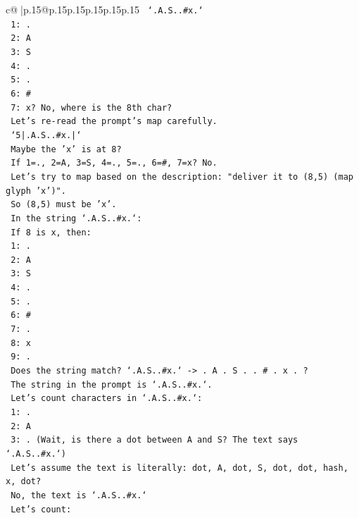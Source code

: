 \documentclass{article}
\begin{document}
{\begin{supertabular}{c@{$\;$}|p{.15\linewidth}@{}p{.15\linewidth}p{.15\linewidth}p{.15\linewidth}p{.15\linewidth}p{.15\linewidth}}
{{{\texttt{   `.A.S..\#x.`} \\
\texttt{   1: .} \\
\texttt{   2: A} \\
\texttt{   3: S} \\
\texttt{   4: .} \\
\texttt{   5: .} \\
\texttt{   6: \#} \\
\texttt{   7: x? No, where is the 8th char?} \\
\texttt{   Let's re{-}read the prompt's map carefully.} \\
\texttt{   `5|.A.S..\#x.|`} \\
\texttt{   Maybe the 'x' is at 8?} \\
\texttt{   If 1=., 2=A, 3=S, 4=., 5=., 6=\#, 7=x? No.} \\
\texttt{   Let's try to map based on the description: "deliver it to (8,5) (map glyph 'x')".} \\
\texttt{   So (8,5) must be 'x'.} \\
\texttt{   In the string `.A.S..\#x.`:} \\
\texttt{   If 8 is x, then:} \\
\texttt{   1: .} \\
\texttt{   2: A} \\
\texttt{   3: S} \\
\texttt{   4: .} \\
\texttt{   5: .} \\
\texttt{   6: \#} \\
\texttt{   7: .} \\
\texttt{   8: x} \\
\texttt{   9: .} \\
\texttt{   Does the string match? `.A.S..\#x.` {-}> . A . S . . \# . x . ?} \\
\texttt{   The string in the prompt is `.A.S..\#x.`.} \\
\texttt{   Let's count characters in `.A.S..\#x.`:} \\
\texttt{   1: .} \\
\texttt{   2: A} \\
\texttt{   3: . (Wait, is there a dot between A and S? The text says `.A.S..\#x.`)} \\
\texttt{   Let's assume the text is literally: dot, A, dot, S, dot, dot, hash, x, dot?} \\
\texttt{   No, the text is `.A.S..\#x.`} \\
\texttt{   Let's count:} \\
}}}
\end{supertabular}}
\end{document}
